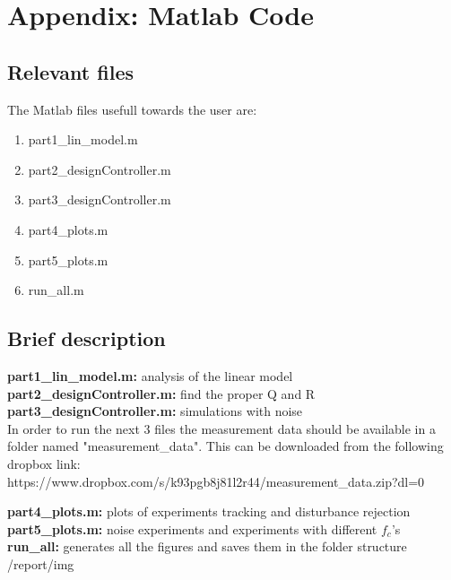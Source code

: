 \section{Appendix: Matlab Code}

\subsection{Relevant files}
The Matlab files usefull towards the user are:
\begin{enumerate}
	\item part1\_lin\_model.m
	\item part2\_designController.m
	\item part3\_designController.m
	\item part4\_plots.m
	\item part5\_plots.m
	\item run\_all.m
\end{enumerate}

\subsection{Brief description}

\textbf{part1\_lin\_model.m:} analysis of the linear model \\
\textbf{part2\_designController.m:} find the proper Q and R \\
\textbf{part3\_designController.m:} simulations with noise \\

In order to run the next 3 files the measurement data should be available in a folder named "measurement\_data". This can be downloaded from the following dropbox link: https://www.dropbox.com/s/k93pgb8j81l2r44/measurement\_data.zip?dl=0 

\textbf{part4\_plots.m:} plots of experiments tracking and disturbance rejection \\
\textbf{part5\_plots.m:} noise experiments and experiments with different $f_c$'s \\
\textbf{run\_all:} generates all the figures and saves them in the folder structure /report/img \\